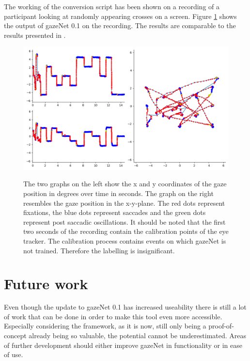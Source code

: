 \documentclass[conference]{IEEEtran}
\begin{document}
The working of the conversion script has been shown on a recording of a participant looking at randomly appearing crosses on a screen. Figure \ref{fig:kreuze} shows the output of gazeNet 0.1 on the recording. The results are comparable to the results presented in \cite{zemblys2018gazeNet}.

\begin{figure}
    \centering
    \includegraphics[width=0.6\linewidth]
    {Kreuze_Random Recording1_short}
    \label{fig:kreuze}
    \caption{The two graphs on the left show the x and y coordinates of the gaze position in degrees over time in seconds. The graph on the right resembles the gaze position in the x-y-plane. The red dots represent fixations, the blue dots represent saccades and the green dots represent post saccadic oscillations. It should be noted that the first two seconds of the recording contain the calibration points of the eye tracker. The calibration process contains events on which gazeNet is not trained. Therefore the labelling is insignificant.}
\end{figure}


\section{Future work}
Even though the update to gazeNet 0.1 has increased useability there is still a lot of work that can be done in order to make this tool even more accessible. Especially considering the framework, as it is now, still only being a proof-of-concept already being so valuable, the potential cannot be underestimated. Areas of further development should either improve gazeNet in functionality or in ease of use.
\end{document}
